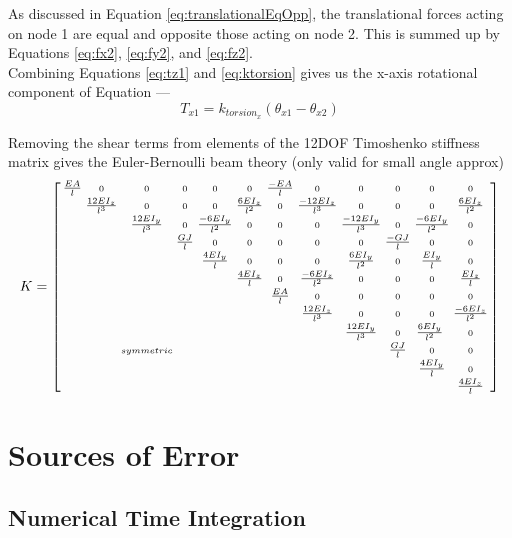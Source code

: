 {As discussed in Equation \ref{eq:translationalEqOpp}, the translational forces acting on node 1 are equal and opposite those acting on node 2.  This is summed up by Equations \ref{eq:fx2}, \ref{eq:fy2}, and \ref{eq:fz2}.\\

Combining Equations \ref{eq:tz1} and \ref{eq:ktorsion} gives us the x-axis rotational component of Equation ---
\[T_{x1} =  k_{torsion_x}(\theta_{x1} - \theta_{x2}) \]

Removing the shear terms from elements of the 12DOF Timoshenko stiffness matrix gives the Euler-Bernoulli beam theory (only valid for small angle approx)\\


\[ K =  \small {\left[ \begin{smallmatrix}
\tfrac{EA}{l} & 0 & 0 & 0 & 0 & 0 & \tfrac{-EA}{l} & 0 & 0 & 0 & 0 & 0\\
 & \tfrac{12EI_z}{l^3} & 0 & 0 & 0 & \tfrac{6EI_z}{l^2} & 0 & \tfrac{-12EI_z}{l^3} & 0 & 0 & 0 & \tfrac{6EI_z}{l^2}\\
 &  & \tfrac{12EI_y}{l^3} & 0 & \tfrac{-6EI_y}{l^2} & 0 & 0 & 0 & \tfrac{-12EI_y}{l^3} & 0 & \tfrac{-6EI_y}{l^2} & 0\\
 &  &  &  \tfrac{GJ}{l} &  0 &  0 &  0 &  0 &  0 & \tfrac{-GJ}{l} & 0 & 0\\
 &  &  &  & \tfrac{4EI_y}{l} & 0 & 0 & 0 & \tfrac{6EI_y}{l^2} & 0 & \tfrac{EI_y}{l} & 0\\
 &  &  &  &  & \tfrac{4EI_z}{l} & 0 & \tfrac{-6EI_z}{l^2} & 0 & 0 & 0 & \tfrac{EI_z}{l}\\
 &  &  &  &  &  & \tfrac{EA}{l}  & 0 & 0 & 0 & 0 & 0\\
 &  &  &  &  &  &  & \tfrac{12EI_z}{l^3} & 0 & 0 & 0 & \tfrac{-6EI_z}{l^2}\\
 &  &  &  &  &  &  &  & \tfrac{12EI_y}{l^3} & 0 & \tfrac{6EI_y}{l^2}\ & 0\\
 &  & symmetric &  &  &  &  &  &  & \tfrac{GJ}{l} & 0 & 0\\
 &  &  &  &  &  &  &  &  &  & \tfrac{4EI_y}{l} & 0\\
  &  &  &  &  &  &  &  &  &  &  & \tfrac{4EI_z}{l}\\
 \end{smallmatrix} \right] } \]

\section{Sources of Error}

\subsection{Numerical Time Integration}

}
